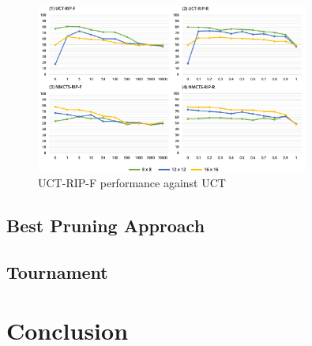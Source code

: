 \documentclass[conference]{IEEEtran}
\begin{document}

\begin{figure}[!h]
\begin{center}
	\includegraphics[width=0.8\textwidth]{figs/PT.pdf}
	\caption{UCT-RIP-F performance against UCT}
	\label{PT}
\end{center}
\end{figure}

\subsection{Best Pruning Approach}

\subsection{Tournament}

\section{Conclusion}



\end{document}

